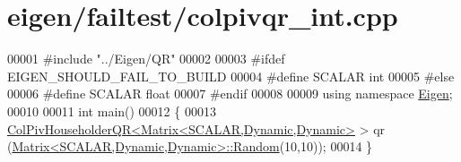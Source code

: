 \hypertarget{eigen_2failtest_2colpivqr__int_8cpp_source}{}\section{eigen/failtest/colpivqr\+\_\+int.cpp}
\label{eigen_2failtest_2colpivqr__int_8cpp_source}

\begin{DoxyCode}
00001 \textcolor{preprocessor}{#include "../Eigen/QR"}
00002 
00003 \textcolor{preprocessor}{#ifdef EIGEN\_SHOULD\_FAIL\_TO\_BUILD}
00004 \textcolor{preprocessor}{#define SCALAR int}
00005 \textcolor{preprocessor}{#else}
00006 \textcolor{preprocessor}{#define SCALAR float}
00007 \textcolor{preprocessor}{#endif}
00008 
00009 \textcolor{keyword}{using namespace }\hyperlink{namespace_eigen}{Eigen};
00010 
00011 \textcolor{keywordtype}{int} main()
00012 \{
00013   \hyperlink{group___q_r___module_class_eigen_1_1_col_piv_householder_q_r}{ColPivHouseholderQR<Matrix<SCALAR,Dynamic,Dynamic>} > qr
      (\hyperlink{group___core___module_class_eigen_1_1_matrix}{Matrix<SCALAR,Dynamic,Dynamic>::Random}(10,10));
00014 \}
\end{DoxyCode}

